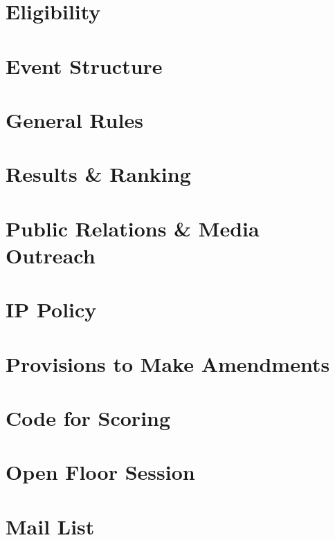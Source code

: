 \documentclass[letterpaper,12pt,titlepage]{article}
\begin{document}
\newpage
\section{Eligibility}


\newpage
\section{Event Structure}


\newpage
\section{General Rules}


\newpage
\section{Results \& Ranking}


\newpage
\section{Public Relations \& Media Outreach}


\newpage
\section{IP Policy}


\newpage
\section{Provisions to Make Amendments}


\appendix
\newpage
\section{Code for Scoring}


\newpage
\section{Open Floor Session}


\newpage
\section{Mail List}

\end{document}
